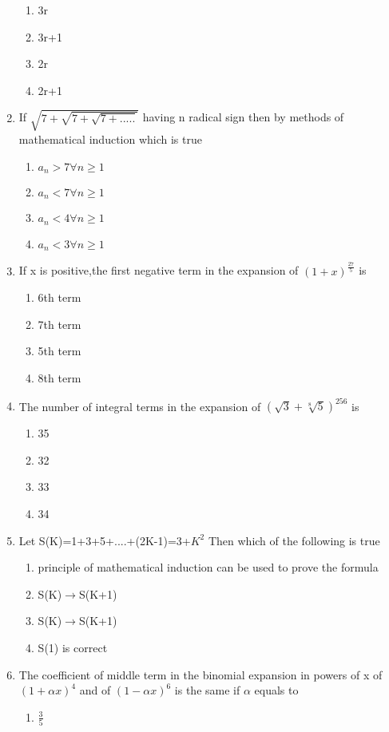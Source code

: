 \begin{enumerate}[label=\arabic*.,ref=\thesubsection.\theenumi]
\begin{enumerate}
\item 3r
\item 3r+1
\item 2r
\item 2r+1
\end{enumerate}
\item If $\sqrt{7+\sqrt{7+\sqrt{7+.....}}}$ having n radical sign then by methods of mathematical induction which is true
\begin{enumerate}
    \item $a_n>7 \forall n\geq1$
    \item $a_n<7 \forall n\geq1$
    \item $a_n<4 \forall n\geq1$
    \item $a_n<3 \forall n\geq1$
\end{enumerate}
\item If x is positive,the first negative term in the expansion of $(1+x)^\frac{27}{5}$ is 
\begin{enumerate}
\item 6th term
\item 7th term 
\item 5th term 
\item 8th term
\end{enumerate}
\item The number of integral terms in the expansion of $(\sqrt{3}+\sqrt[8]{5})^{256}$ is 
\begin{enumerate}
    \item 35
    \item 32
    \item 33
    \item 34
\end{enumerate}
\item Let S(K)=1+3+5+....+(2K-1)=3+$K^2$ Then which of the following is true
\begin{enumerate}
    \item principle of mathematical induction can be used to prove the formula
    \item S(K)$\rightarrow$S(K+1)
    \item S(K)$\rightarrow$S(K+1)
    \item S(1) is correct
\end{enumerate}
\item The coefficient of middle term in the binomial expansion in powers of x of$(1+\alpha x)^4$ and of $(1-\alpha x)^6$ is the same if $\alpha$ equals to
\begin{enumerate}
    \item $\frac{3}{5}$

\end{enumerate}
\end{enumerate}

